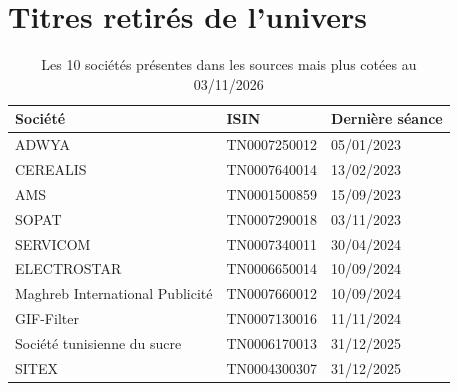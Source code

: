 \documentclass[11pt,a4paper]{article}
\begin{document}
\section{Titres retirés de l'univers}\label{ann:retires}
\begin{table}[H]\centering\small
\caption{Les 10 sociétés présentes dans les sources mais plus cotées au 03/11/2026}\label{tab:retires}
\begin{tabular}{lll}\toprule
Société & ISIN & Dernière séance \\ \midrule
ADWYA & TN0007250012 & 05/01/2023 \\
CEREALIS & TN0007640014 & 13/02/2023 \\
AMS & TN0001500859 & 15/09/2023 \\
SOPAT & TN0007290018 & 03/11/2023 \\
SERVICOM & TN0007340011 & 30/04/2024 \\
ELECTROSTAR & TN0006650014 & 10/09/2024 \\
Maghreb International Publicité & TN0007660012 & 10/09/2024 \\
GIF-Filter & TN0007130016 & 11/11/2024 \\
Société tunisienne du sucre & TN0006170013 & 31/12/2025 \\
SITEX & TN0004300307 & 31/12/2025 \\
\bottomrule\end{tabular}
\end{table}
\end{document}
